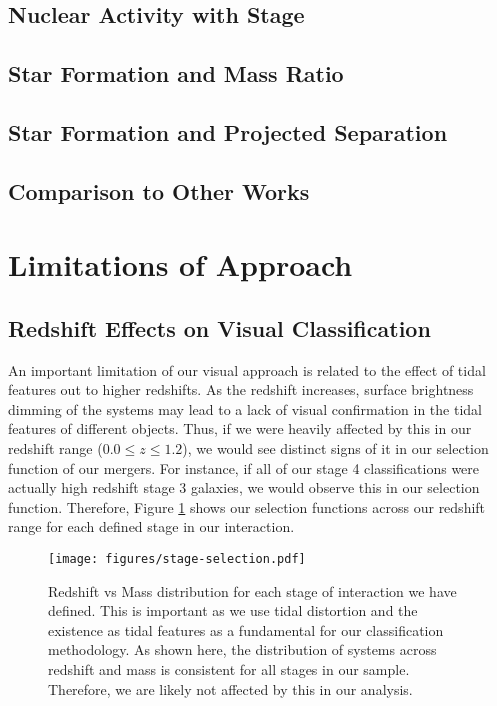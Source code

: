 \documentclass[fleqn,usenatbib]{mnras}
\begin{document}
\subsection{Nuclear Activity with Stage}

\subsection{Star Formation and Mass Ratio}

\subsection{Star Formation and Projected Separation}

\subsection{Comparison to Other Works}

\section{Limitations of Approach}\label{sec:limitations}
\subsection{Redshift Effects on Visual Classification}
\noindent An important limitation of our visual approach is related to the effect of tidal features out to higher redshifts. As the redshift increases, surface brightness dimming of the systems may lead to a lack of visual confirmation in the tidal features of different objects. Thus, if we were heavily affected by this in our redshift range ($0.0 \leq z \leq 1.2$), we would see distinct signs of it in our selection function of our mergers. For instance, if all of our stage 4 classifications were actually high redshift stage 3 galaxies, we would observe this in our selection function. Therefore, Figure \ref{fig:redshift_selection} shows our selection functions across our redshift range for each defined stage in our interaction.

\begin{figure}
    \centering
    \texttt{[image: figures/stage-selection.pdf]}
    \caption{Redshift vs Mass distribution for each stage of interaction we have defined. This is important as we use tidal distortion and the existence as tidal features as a fundamental for our classification methodology. As shown here, the distribution of systems across redshift and mass is consistent for all stages in our sample. Therefore, we are likely not affected by this in our analysis.}
    \label{fig:redshift_selection}
\end{figure}
\end{document}
